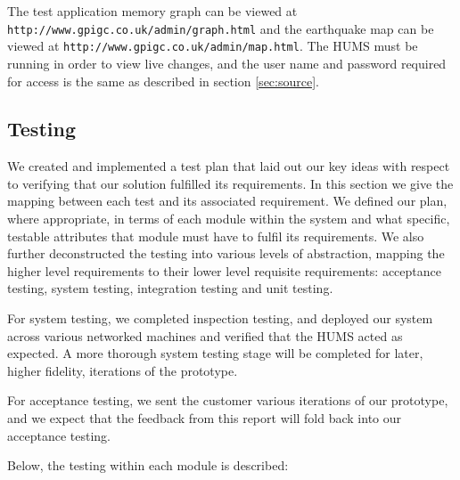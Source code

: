 \documentclass[10pt,a4paper]{article}
\begin{document}
The test application memory graph can be viewed at 
\verb+http://www.gpigc.co.uk/admin/graph.html+ and the earthquake 
map can be viewed at \verb+http://www.gpigc.co.uk/admin/map.html+. 
The HUMS must be running in order to view live changes, and the user name
and password required for access is the same as described in section
\ref{sec:source}.

\subsection{Testing} 
We created and implemented a test plan that laid out our key ideas
with respect to verifying that our solution fulfilled its
requirements. In this section we give the mapping between each
test and its associated requirement. We
defined our plan, where appropriate, in terms of each module within
the system and what specific, testable attributes that module must
have to fulfil its requirements. We also further deconstructed the
testing into various levels of abstraction, mapping the higher level
requirements to their lower level requisite requirements: acceptance
testing, system testing, integration testing and unit
testing.


For system testing, we completed inspection testing, and deployed our system across various networked machines and verified that the HUMS acted as expected. A more thorough system testing stage will be completed for later, higher fidelity, iterations of the prototype.

For acceptance testing, we sent the customer various iterations of our prototype, and we expect that the feedback from this report will fold back into our acceptance testing.

Below, the testing within each module is described:
\end{document}
